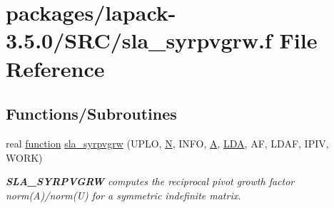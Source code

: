 \hypertarget{sla__syrpvgrw_8f}{}\section{packages/lapack-\/3.5.0/\+S\+R\+C/sla\+\_\+syrpvgrw.f File Reference}
\label{sla__syrpvgrw_8f}
\subsection*{Functions/\+Subroutines}
\begin{DoxyCompactItemize}
\item 
real \hyperlink{afunc_8m_a7b5e596df91eadea6c537c0825e894a7}{function} \hyperlink{group__realSYcomputational_ga0710d9e3e5ee6bcf61e9edebc7d3cf4f}{sla\+\_\+syrpvgrw} (U\+P\+L\+O, \hyperlink{polmisc_8c_a0240ac851181b84ac374872dc5434ee4}{N}, I\+N\+F\+O, \hyperlink{classA}{A}, \hyperlink{example__user_8c_ae946da542ce0db94dced19b2ecefd1aa}{L\+D\+A}, A\+F, L\+D\+A\+F, I\+P\+I\+V, W\+O\+R\+K)
\begin{DoxyCompactList}\small\item\em {\bfseries S\+L\+A\+\_\+\+S\+Y\+R\+P\+V\+G\+R\+W} computes the reciprocal pivot growth factor norm(\+A)/norm(U) for a symmetric indefinite matrix. \end{DoxyCompactList}\end{DoxyCompactItemize}
